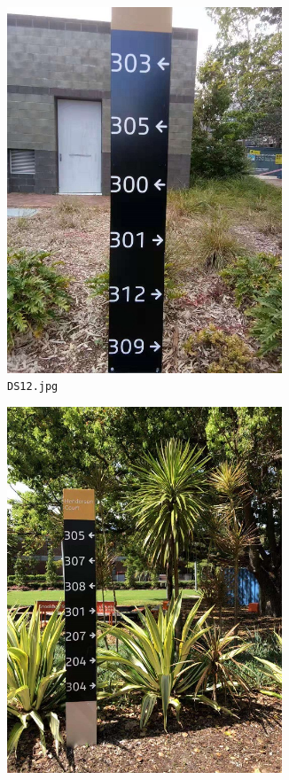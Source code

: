 \documentclass{article}
\begin{document}
\begin{figure}[h]
\begin{subfigure}[t]{0.22\textwidth}
    \includegraphics[width=0.9\textwidth]{../train/task2/DS12}
    \caption[DS12]{
      \lstinline{DS12.jpg}
    }
    \label{fig:ds12}
  \end{subfigure}
  \begin{subfigure}[t]{0.22\textwidth}
    \centering
    \includegraphics[width=0.9\textwidth]{../train/task2/DS13}

\end{subfigure}
\end{figure}
\end{document}
